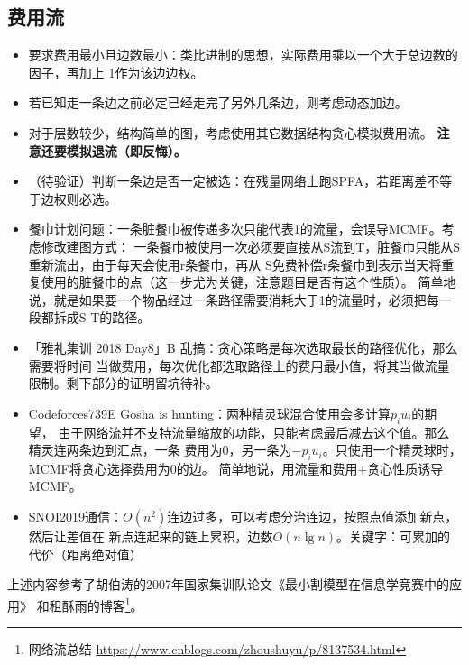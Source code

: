 \subsection{费用流}
\begin{itemize}
    \item 要求费用最小且边数最小：类比进制的思想，实际费用乘以一个大于总边数的因子，再加上
    1作为该边边权。
    \item 若已知走一条边之前必定已经走完了另外几条边，则考虑动态加边。
    \item 对于层数较少，结构简单的图，考虑使用其它数据结构贪心模拟费用流。
    {\bfseries 注意还要模拟退流（即反悔）。}
    \item （待验证）判断一条边是否一定被选：在残量网络上跑SPFA，若距离差不等于边权则必选。
    \item 餐巾计划问题：一条脏餐巾被传递多次只能代表1的流量，会误导MCMF。考虑修改建图方式：
    一条餐巾被使用一次必须要直接从S流到T，脏餐巾只能从S重新流出，由于每天会使用r条餐巾，再从
    S免费补偿r条餐巾到表示当天将重复使用的脏餐巾的点（这一步尤为关键，注意题目是否有这个性质）。
    简单地说，就是如果要一个物品经过一条路径需要消耗大于1的流量时，必须把每一段都拆成S-T的路径。

    \item 「雅礼集训 2018 Day8」B 乱搞：贪心策略是每次选取最长的路径优化，那么需要将时间
    当做费用，每次优化都选取路径上的费用最小值，将其当做流量限制。剩下部分的证明留坑待补。
    \item Codeforces739E Gosha is hunting：两种精灵球混合使用会多计算$p_iu_i$的期望，
    由于网络流并不支持流量缩放的功能，只能考虑最后减去这个值。那么精灵连两条边到汇点，一条
    费用为0，另一条为$-p_iu_i$。只使用一个精灵球时，MCMF将贪心选择费用为0的边。
    简单地说，用流量和费用+贪心性质诱导MCMF。
    \item SNOI2019通信：$O(n^2)$连边过多，可以考虑分治连边，按照点值添加新点，然后让差值在
    新点连起来的链上累积，边数$O(n\lg n)$。关键字：可累加的代价（距离绝对值）
\end{itemize}

上述内容参考了胡伯涛的2007年国家集训队论文《最小割模型在信息学竞赛中的应用》
\cite{MCIOI}和租酥雨的博客\footnote{
    网络流总结
    \url{https://www.cnblogs.com/zhoushuyu/p/8137534.html}
}。
